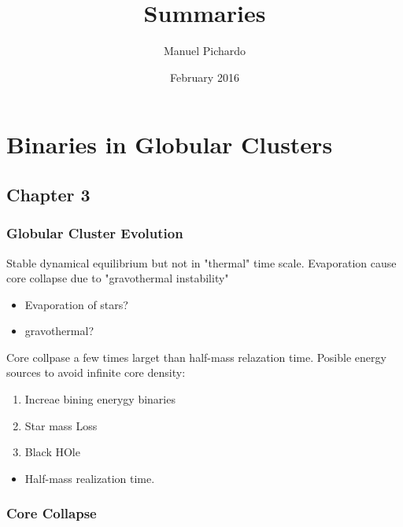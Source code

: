 \documentclass{article}
\title{Summaries}
\author{Manuel Pichardo}
\date{February 2016}
\newcounter{para}[subsubsection]
\begin{document}
\maketitle

\section{Binaries in Globular Clusters}


\subsection{Chapter 3}

\subsubsection{Globular Cluster Evolution}

\vspace{.3cm}
\addtocounter{para}{1}
\vspace{.3cm}

Stable dynamical equilibrium but not in "thermal" time scale. Evaporation cause core collapse due to "gravothermal instability"



\begin{itemize}
    \item Evaporation of stars?
    \item gravothermal?
\end{itemize}


\vspace{.3cm}
\addtocounter{para}{1}
\vspace{.3cm}

Core collpase a few times larget than half-mass relazation time. Posible energy sources to avoid infinite core density:

\begin{enumerate}
    \item Increae bining enerygy binaries
    \item Star mass Loss
    \item Black HOle
\end{enumerate}
\begin{itemize}
    \item Half-mass realization time.
\end{itemize}



\subsubsection{Core Collapse}
\end{document}
